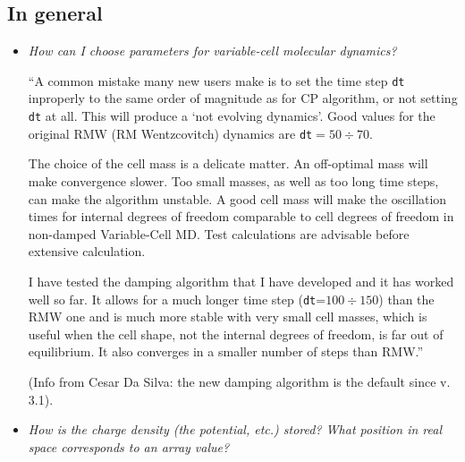 \documentclass[12pt,a4paper]{article}
\begin{document}
\subsection{In general}

\begin{itemize}
\item {\em How can I choose parameters for variable-cell 
molecular dynamics?}

``A common mistake many new users make is to set the time step 
\texttt{dt} inproperly to the same order of magnitude as for CP 
algorithm, or not setting \texttt{dt} at all. This will produce 
a `not evolving dynamics'. Good values for the original RMW
(RM Wentzcovitch) dynamics are \texttt{dt}$=50\div70$. 

The choice of the cell mass is a delicate matter. An off-optimal mass 
will make convergence slower. Too small masses, as well as too long time 
steps, can make the algorithm unstable. A good cell mass will make the 
oscillation times for internal degrees of freedom comparable to 
cell degrees of freedom in non-damped Variable-Cell MD. Test calculations 
are advisable before extensive calculation.

I have tested the damping algorithm that I have developed and it has
worked well so far. It allows for a much longer time step 
(\texttt{dt}=$100\div150$) than the RMW one and is much more stable 
with very small cell masses, which is useful when the cell shape, 
not the internal degrees of freedom, is far out of equilibrium. 
It also converges in  a smaller number of steps than RMW.''

(Info from Cesar Da Silva: the new damping algorithm is the default
since v. 3.1).


\item {\em How is the charge density (the potential, etc.) stored?
What position in real space  corresponds to an array value? }


\end{itemize}
\end{document}
